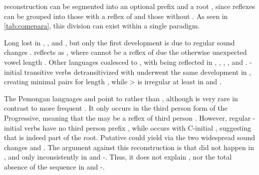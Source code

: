 
%
 reconstruction  can be segmented into an optional prefix  and a root , since reflexes can be grouped into those with a reflex of  and those without .
As seen in \cref{tab:comepara}, this division can exist within a single paradigm.





Long  lost  in \trio, \apalai, and \bakairi, but only the first development is due to regular sound changes \parencite[31--32]{meira1998proto}.
\akuriyo reflects  as , where  cannot be a reflex of  due the otherwise unexpected vowel length \parencite[114--115]{meira1998proto}.
Other languages coalesced  to , with  being reflected in \uxc \parencite[452]{gildea2012classification}, \kalina, \kaxui, \panare, and \yawarana.
-initial transitive verbs detransitivized with  underwent the same development in \kalina, creating minimal pairs for length \parencite[509--510]{meira2010origin}, while  >  is irregular at least in \kaxui and \panare.



The Pemongan languages and \kaxui point to  rather than , although \kaxui {} is very rare in contrast to more frequent .
It only occurs in the third person form of the Progressive, meaning that the  may be a reflex of third person .
However, regular -initial \kaxui verbs have no third person prefix , while  occurs with C-initial  , suggesting that  is indeed part of the root.
Putative \PC {} could yield  via the two widespread sound changes  and  \parencite{meira2010origin}.
The argument against this reconstruction is that  did not happen in \PPar, and only inconsistently in \PPP and \mapoyo-\yawarana \parencites[501--502]{meira2010origin}{gildea2010story}.
Thus, it does not explain \kaxui {}, nor the total absence of the sequence  in \panare and \mapoyo-\yawarana.
%
%

